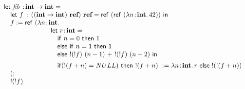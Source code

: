 \documentclass[10pt]{article}
\begin{document}
\begin{exercise}
\(
\begin{array}{l}
\lamfnt{let}~\mathit{fib}~\ty \typ{int} \arrow \typ{int} = \\
\quad \lamfnt{let}~f~\ty~((\typ{int} \arrow \typ{int})~\typ{ref})~\typ{ref} = \lamfnt{ref}~(\lamfnt{ref}~(\lam{n\ty\typ{int}}{42}))~\lamfnt{in}\\
\quad f := \lamfnt{ref}~(\lambda n\ty\typ{int}.\\
\hspace*{25mm} \lamfnt{let}~r \ty \typ{int} = \\
\hspace*{25mm} \quad \lamfnt{if}~n = 0~\lamfnt{then}~1\\ 
\hspace*{25mm} \quad \lamfnt{else}~\lamfnt{if}~n = 1~\lamfnt{then}~1\\ 
\hspace*{25mm} \quad \lamfnt{else}~!(!f)~(n-1)~+~!(!f)~(n-2)~\lamfnt{in}\\[.5em]
\hspace*{25mm} \quad \lamfnt{if} (!(f + n) = NULL) \ \lamfnt{then} \ !(f + n)\ := \lam{n\ty\typ{int}}{r} \ \lamfnt{else} \ !(!(f + n))\\
\quad );\\
\quad !(!f)
\end{array}
\)
\end{exercise}
\end{document}
